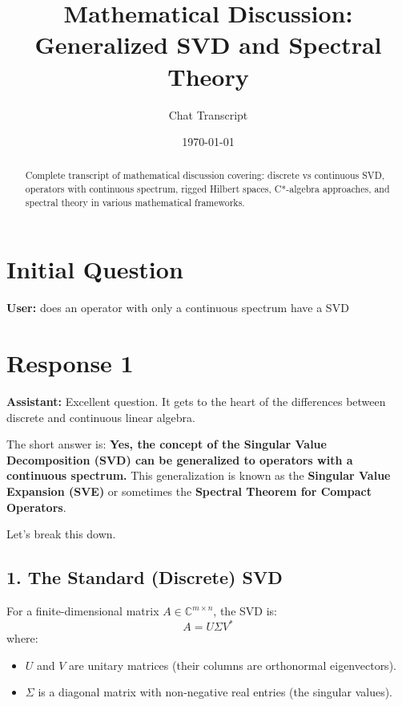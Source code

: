 \documentclass[aps,prl,reprint]{revtex4-2}
\begin{document}
\title{Mathematical Discussion: Generalized SVD and Spectral Theory}
\author{Chat Transcript}
\date{\today}

\begin{abstract}
Complete transcript of mathematical discussion covering: discrete vs
continuous SVD, operators with continuous spectrum, rigged Hilbert spaces,
C*-algebra approaches, and spectral theory in various mathematical
frameworks.
\end{abstract}

\maketitle

\section*{Initial Question}

\textbf{User:} does an operator with only a continuous spectrum have a SVD

\section*{Response 1}

\textbf{Assistant:} Excellent question. It gets to the heart of the
differences between discrete and continuous linear algebra.

The short answer is: \textbf{Yes, the concept of the Singular Value
Decomposition (SVD) can be generalized to operators with a continuous
spectrum.} This generalization is known as the \textbf{Singular Value
Expansion (SVE)} or sometimes the \textbf{Spectral Theorem for Compact
Operators}.

Let's break this down.

\subsection*{1. The Standard (Discrete) SVD}

For a finite-dimensional matrix $A \in \mathbb{C}^{m \times n}$, the SVD is: 
\begin{equation*}
A = U \Sigma V^* 
\end{equation*}
where:

\begin{itemize}
\item $U$ and $V$ are unitary matrices (their columns are orthonormal
eigenvectors).

\item $\Sigma$ is a diagonal matrix with non-negative real entries (the
singular values).
\end{itemize}
\end{document}
